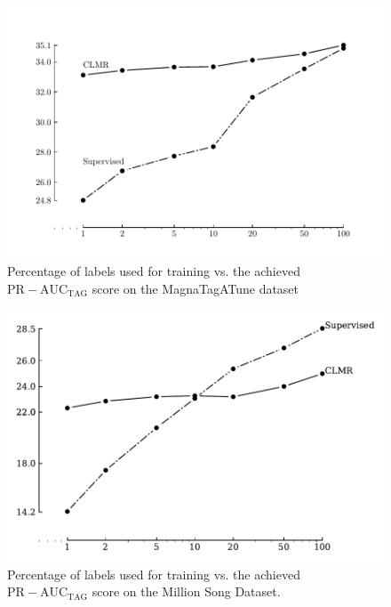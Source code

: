 \begin{figure}[h]
    \centering
    \includegraphics[width=\columnwidth]{figs/perc_train_data_magnatagatune.pdf}
    \caption{Percentage of labels used for training vs. the achieved $\mathrm{PR-AUC}_{\mathrm{TAG}}$ score on the MagnaTagATune dataset}
    \label{fig:perc_train_data_magnatagatune}
\end{figure}

\begin{figure}[h]
    \centering
    \includegraphics[width=\columnwidth]{figs/perc_train_data_msd.pdf}
    \caption{Percentage of labels used for training vs. the achieved $\mathrm{PR-AUC}_{\mathrm{TAG}}$ score on the Million Song Dataset.}
    \label{fig:perc_train_data_msd}
\end{figure}




